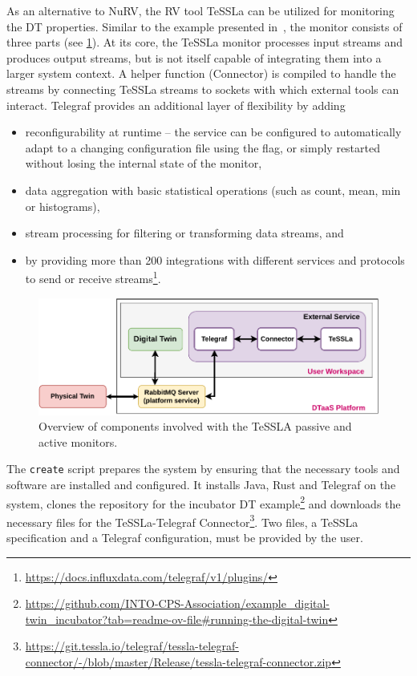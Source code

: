 As an alternative to NuRV, the RV tool TeSSLa can be utilized for monitoring the DT properties.
Similar to the example presented in~\cite{TT-Connector}, the monitor consists of three parts (see \cref{fig:architecture-diagram}).
At its core, the TeSSLa monitor processes input streams and produces output streams, but is not itself capable of integrating them into a larger system context.
A helper function (Connector) is compiled to handle the streams by connecting TeSSLa streams to sockets with which external tools can interact.
Telegraf provides an additional layer of flexibility by adding
\begin{itemize}
	\item reconfigurability at runtime -- the service can be configured to automatically adapt to a changing configuration file using the  flag, or simply restarted without losing the internal state of the monitor,
	\item data aggregation with basic statistical operations (such as count, mean, min or histograms),
	\item stream processing for filtering or transforming data streams, and
	\item by providing more than 200 integrations with different services and protocols to send or receive streams\footnote{\url{https://docs.influxdata.com/telegraf/v1/plugins/}}.
\end{itemize}%
%
\begin{figure}[tbp]
	\centering
	\includegraphics[width=\columnwidth]{images/TeSSLa-integration.pdf}
	\caption{Overview of components involved with the TeSSLA passive and active monitors.}
	\label{fig:architecture-diagram}
\end{figure}%
%
The \texttt{create} script prepares the system by ensuring that the necessary tools and software are installed and configured.
It installs Java, Rust and Telegraf on the system, clones the repository for the incubator DT example\footnote{\url{https://github.com/INTO-CPS-Association/example_digital-twin_incubator?tab=readme-ov-file\#running-the-digital-twin}} and downloads the necessary files for the TeSSLa-Telegraf Connector\footnote{\url{https://git.tessla.io/telegraf/tessla-telegraf-connector/-/blob/master/Release/tessla-telegraf-connector.zip}}. Two files, a TeSSLa specification and a Telegraf configuration, must be provided by the user.

